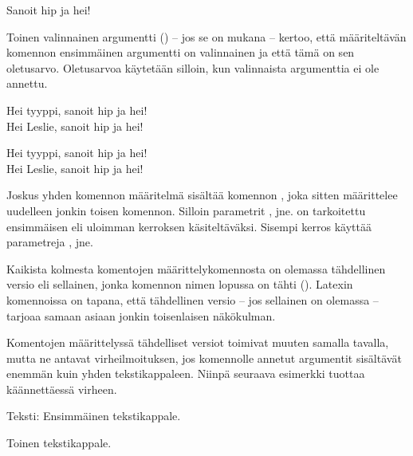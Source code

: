 \begin{tulossis}
  Sanoit hip ja hei!
\end{tulossis}

Toinen valinnainen argumentti () -- jos se on mukana --
kertoo, että määriteltävän komennon ensimmäinen argumentti on
valinnainen ja että tämä on sen ole\-tus\-arvo. Ole\-tus\-arvoa
käytetään silloin, kun valinnaista argumenttia ei ole annettu.

\pagebreak[3]

\begin{koodilohkosis}
  \newcommand{\komento}[3][tyyppi]{Hei #1, sanoit #2 ja #3!}
  \komento{hip}{hei} \\
  \komento[Leslie]{hip}{hei}
\end{koodilohkosis}

\begin{tulossis}
  Hei tyyppi, sanoit hip ja hei! \\
  Hei Leslie, sanoit hip ja hei!
\end{tulossis}

Joskus yhden komennon määritelmä sisältää komennon , joka sitten määrittelee uudelleen jonkin toisen
komennon. Silloin parametrit ,  jne. on
tarkoitettu ensimmäisen eli uloimman kerroksen käsiteltäväksi. Sisempi
kerros käyttää parametreja ,  jne.

Kaikista kolmesta komentojen määrittelykomennosta on olemassa
tähdellinen versio eli sellainen, jonka komennon nimen lopussa on tähti
(\koodi{*}). Latexin komennoissa on tapana, että tähdellinen versio --
jos sellainen on olemassa -- tarjoaa samaan asiaan jonkin toisenlaisen
näkökulman.

\begin{koodilohkosis}
  \newcommand*     {\nimi}[n][oletus]{määritelmä}
  \renewcommand*   {\nimi}[n][oletus]{määritelmä}
  \providecommand* {\nimi}[n][oletus]{määritelmä}
\end{koodilohkosis}

Komentojen määrittelyssä tähdelliset versiot toimivat muuten samalla
tavalla, mutta ne antavat virheilmoituksen, jos komennolle annetut
argumentit sisältävät enemmän kuin yhden tekstikappaleen. Niinpä
seuraava esimerkki tuottaa käännettäessä virheen.

\begin{koodilohkosis}
  \newcommand*{\komento}[1]{Teksti: #1}

  \komento{
    Ensimmäinen tekstikappale.

    Toinen tekstikappale.
  }
\end{koodilohkosis}

